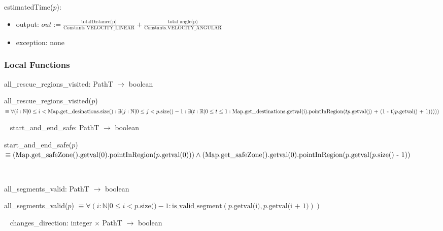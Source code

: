 \documentclass[12pt]{article}
\begin{document}
\noindent estimatedTime($p$):
\begin{itemize}
\item output: $ out := \frac{\mbox{totalDistance(p)}}{\mbox{Constants.VELOCITY\_LINEAR}} + \frac{\mbox{total\_angle(p)}}{\mbox{Constants.VELOCITY\_ANGULAR}} $
\item exception: none
\end{itemize}



\newpage

\subsubsection* {Local Functions}
\allowbreak


\noindent all\_rescue\_regions\_visited: PathT $\rightarrow$ boolean

\noindent all\_rescue\_regions\_visited($p$) $\equiv \forall (i : \mathbb{N} | 0 \leq i < \mbox{Map.get\_desinations.size()} : \exists(j : \mathbb{N} | 0 \leq j < p.\mbox{size()} - 1 : \exists(t : \mathbb{R} | 0 \leq t \leq 1 : \mbox{Map.get\_destinations.getval(i).pointInRegion}\newline(tp.\mbox{getval(j) + (1 - t)}p.\mbox{getval(j + 1)}))))$

~\newline
{}
\newline
\noindent start\_and\_end\_safe: PathT $\rightarrow$ boolean

\noindent start\_and\_end\_safe($p$) $ \equiv (\mbox{Map.get\_safeZone().getval(0).pointInRegion}(p.\mbox{getval(0)})) \wedge \newline(\mbox{Map.get\_safeZone().getval(0).pointInRegion}(p.\mbox{getval}(p.\mbox{size() - 1})) $

~\newline
{}

\noindent all\_segments\_valid: PathT $\rightarrow$ boolean

\noindent all\_segments\_valid($p$) $\equiv \forall (i : \mathbb{N} | 0 \leq i < p.\mbox{size()} - 1 : \mbox{is\_valid\_segment}(p.\mbox{getval(i)}, p.\mbox{getval(i + 1)})) $

~\newline
{}
\newline
\noindent changes\_direction: integer $\times$ PathT $\rightarrow$ boolean
\end{document}
